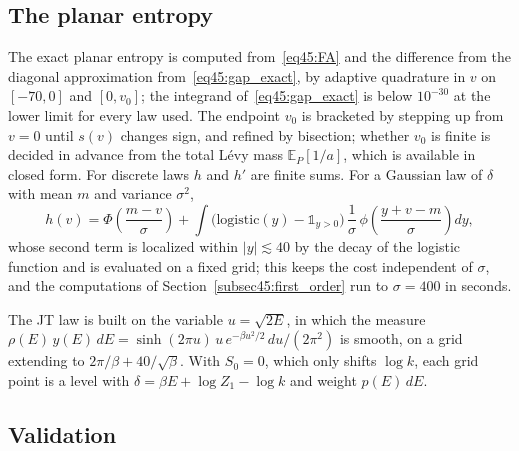 \documentclass[11pt,letterpaper]{article}
\theoremstyle{plain}
\theoremstyle{definition}
\theoremstyle{remark}
\begin{document}
\subsection{The planar entropy}
\label{subsecE:overview}

The exact planar entropy is computed from~\eqref{eq45:FA} and the difference from the diagonal approximation from~\eqref{eq45:gap_exact}, by adaptive quadrature in $v$ on $[-70, 0]$ and $[0, v_0]$; the integrand of~\eqref{eq45:gap_exact} is below $10^{-30}$ at the lower limit for every law used. The endpoint $v_0$ is bracketed by stepping up from $v = 0$ until $s(v)$ changes sign, and refined by bisection; whether $v_0$ is finite is decided in advance from the total L\'evy mass $\mathbb{E}_P[1/a]$, which is available in closed form. For discrete laws $h$ and $h'$ are finite sums. For a Gaussian law of $\delta$ with mean $m$ and variance $\sigma^2$,
\begin{equation}
\label{eqE:h_gaussian}
h(v) = \Phi\!\left(\frac{m - v}{\sigma}\right) + \int \big(\mathrm{logistic}(y) - \mathbb{1}_{y > 0}\big)\, \frac{1}{\sigma}\,\phi\!\left(\frac{y + v - m}{\sigma}\right) dy,
\end{equation}
whose second term is localized within $|y| \lesssim 40$ by the decay of the logistic function and is evaluated on a fixed grid; this keeps the cost independent of $\sigma$, and the computations of Section~\ref{subsec45:first_order} run to $\sigma = 400$ in seconds.

The JT law is built on the variable $u = \sqrt{2E}$, in which the measure $\rho(E)\,y(E)\,dE = \sinh(2\pi u)\,u\,e^{-\beta u^2/2}\,du/(2\pi^2)$ is smooth, on a grid extending to $2\pi/\beta + 40/\sqrt{\beta}$. With $S_0 = 0$, which only shifts $\log k$, each grid point is a level with $\delta = \beta E + \log Z_1 - \log k$ and weight $p(E)\,dE$.

\subsection{Validation}
\label{subsecE:validation}
\end{document}
